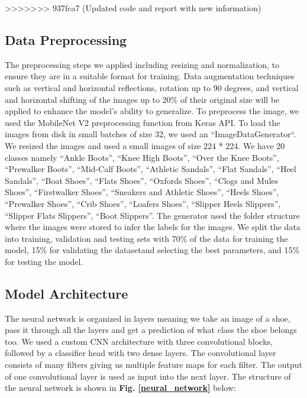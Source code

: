 \documentclass[11pt,a4paper]{article}
\begin{document}
>>>>>>> 937fca7 (Updated code and report with new information)
\subsection{Data Preprocessing}
The preprocessing steps we applied including resizing and normalization, to ensure they are in a suitable format for training. Data augmentation techniques such as vertical and horizontal reflections, rotation up to 90 degrees, and vertical and horizontal shifting of the images up to 20\% of their original size will be applied to enhance the model's ability to generalize.  To preprocess the image, we used the MobileNet V2 preprocessing function from Keras API.  To load the images from disk in small batches of size 32, we used an ``ImageDataGenerator``.  We resized the images and used a small images of size 224 * 224. We have 20 classes namely ``Ankle Boots'', ``Knee High Boots'', ``Over the Knee Boots'', ``Prewalker Boots'', ``Mid-Calf Boots'', ``Athletic Sandals'', ``Flat Sandals'', ``Heel Sandals'', ``Boat Shoes'', ``Flats Shoes'', ``Oxfords Shoes'', ``Clogs and Mules Shoes'',  ``Firstwalker Shoes'', ``Sneakers and Athletic Shoes'', ``Heels Shoes'', ``Prewalker Shoes'', ``Crib Shoes'', ``Loafers Shoes'', ``Slipper Heels Slippers'', ``Slipper Flats Slippers'', ``Boot Slippers''. The generator used the folder structure where the images were stored to infer the labels for the images. We split the data into training, validation and testing sets with 70\% of the data for training the model, 15\% for validating the datasetand selecting the best parameters, and 15\% for testing the model. 

\subsection{Model Architecture}
The neural network is organized in layers meaning we take an image of a shoe, pass it through all the layers and get a prediction of what class the shoe belongs too. We used a custom CNN architecture with three convolutional blocks, followed by a classifier head with two dense layers. The convolutional layer consists of many filters giving us multiple feature maps for each filter.  The output of one convolutional layer is used as input into the next layer. The structure of the neural network is shown in \textbf{Fig. \ref{neural_network}} below:
\end{document}
